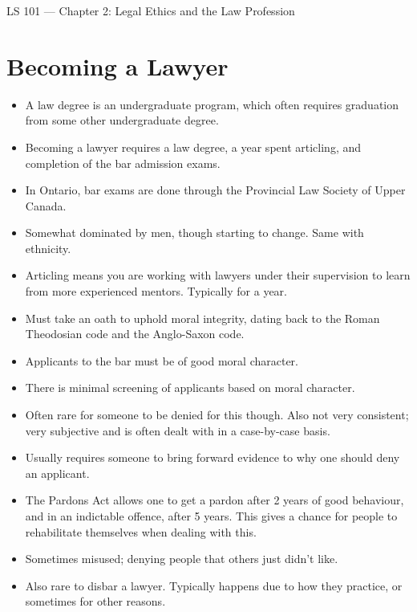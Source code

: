 \documentclass{article}
\author{Clement Tsang}
\begin{document}
\begin{center}
    \Large{LS 101 --- Chapter 2: Legal Ethics and the Law Profession}
\end{center}

\section{Becoming a Lawyer}
\begin{itemize}
    \item A law degree is an undergraduate program, which often requires graduation from some other undergraduate degree.
    \item Becoming a lawyer requires a law degree, a year spent articling, and completion of the bar admission exams.
    \item In Ontario, bar exams are done through the Provincial Law Society of Upper Canada.
    \item Somewhat dominated by men, though starting to change.  Same with ethnicity.
    \item Articling means you are working with lawyers under their supervision to learn from more experienced mentors.  Typically for a year.
    \item Must take an oath to uphold moral integrity, dating back to the Roman Theodosian code and the Anglo-Saxon code.
    \item Applicants to the bar must be of good moral character.
    \item There is minimal screening of applicants based on moral character.
    \item Often rare for someone to be denied for this though.  Also not very consistent; very subjective and is often dealt with in a case-by-case basis.
    \item Usually requires someone to bring forward evidence to why one should deny an applicant.
    \item The Pardons Act allows one to get a pardon after 2 years of good behaviour, and in an indictable offence, after 5 years.  This gives a chance for people to rehabilitate themselves when dealing with this.
    \item Sometimes misused; denying people that others just didn't like.
    \item Also rare to disbar a lawyer.  Typically happens due to how they practice, or sometimes for other reasons.
\end{itemize}
\end{document}
